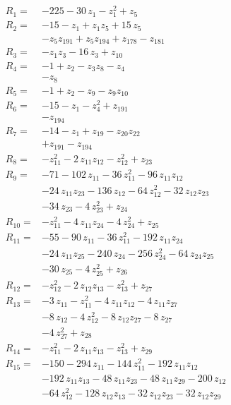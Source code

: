 \begingroup
\small
\allowdisplaybreaks[4]
\begin{align*}
R_{1}={}&-225 -30\,z_{1} -z_{1}^{2} +z_{5}\\[2pt]
R_{2}={}&-15 -z_{1} +z_{1}z_{5} +15\,z_{5}\\
&-z_{5}z_{191} +z_{5}z_{194} +z_{178} -z_{181}\\[2pt]
R_{3}={}&-z_{1}z_{3} -16\,z_{3} +z_{10}\\[2pt]
R_{4}={}&-1 +z_{2} -z_{3}z_{8} -z_{4}\\
&-z_{8}\\[2pt]
R_{5}={}&-1 +z_{2} -z_{9} -z_{9}z_{10}\\[2pt]
R_{6}={}&-15 -z_{1} -z_{4}^{2} +z_{191}\\
&-z_{194}\\[2pt]
R_{7}={}&-14 -z_{1} +z_{19} -z_{20}z_{22}\\
&+z_{191} -z_{194}\\[2pt]
R_{8}={}&-z_{11}^{2} -2\,z_{11}z_{12} -z_{12}^{2} +z_{23}\\[2pt]
R_{9}={}&-71 -102\,z_{11} -36\,z_{11}^{2} -96\,z_{11}z_{12}\\
&-24\,z_{11}z_{23} -136\,z_{12} -64\,z_{12}^{2} -32\,z_{12}z_{23}\\
&-34\,z_{23} -4\,z_{23}^{2} +z_{24}\\[2pt]
R_{10}={}&-z_{11}^{2} -4\,z_{11}z_{24} -4\,z_{24}^{2} +z_{25}\\[2pt]
R_{11}={}&-55 -90\,z_{11} -36\,z_{11}^{2} -192\,z_{11}z_{24}\\
&-24\,z_{11}z_{25} -240\,z_{24} -256\,z_{24}^{2} -64\,z_{24}z_{25}\\
&-30\,z_{25} -4\,z_{25}^{2} +z_{26}\\[2pt]
R_{12}={}&-z_{12}^{2} -2\,z_{12}z_{13} -z_{13}^{2} +z_{27}\\[2pt]
R_{13}={}&-3\,z_{11} -z_{11}^{2} -4\,z_{11}z_{12} -4\,z_{11}z_{27}\\
&-8\,z_{12} -4\,z_{12}^{2} -8\,z_{12}z_{27} -8\,z_{27}\\
&-4\,z_{27}^{2} +z_{28}\\[2pt]
R_{14}={}&-z_{11}^{2} -2\,z_{11}z_{13} -z_{13}^{2} +z_{29}\\[2pt]
R_{15}={}&-150 -294\,z_{11} -144\,z_{11}^{2} -192\,z_{11}z_{12}\\
&-192\,z_{11}z_{13} -48\,z_{11}z_{23} -48\,z_{11}z_{29} -200\,z_{12}\\
&-64\,z_{12}^{2} -128\,z_{12}z_{13} -32\,z_{12}z_{23} -32\,z_{12}z_{29}\\

\end{align*}
